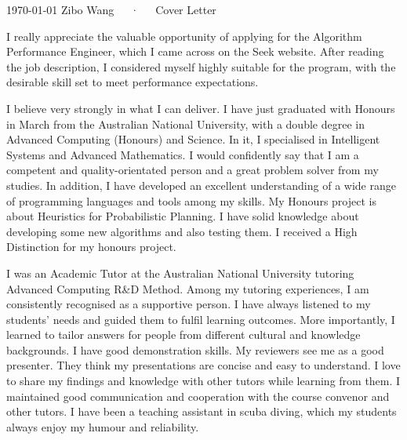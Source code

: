 \documentclass[11pt, a4paper]{awesome-cv}
\begin{document}
\makecvheader[R]

\makecvfooter
  {\today}
  {Zibo Wang~~~·~~~Cover Letter}
  {}

\makelettertitle

\begin{cvletter}

I really appreciate the valuable opportunity of applying for the Algorithm Performance Engineer, which I came across on the Seek website. After reading the job description, I considered myself highly suitable for the program, with the desirable skill set to meet performance expectations.


I believe very strongly in what I can deliver. I have just graduated with Honours in March from the Australian National University, with a double degree in Advanced Computing (Honours) and Science. In it, I specialised in Intelligent Systems and Advanced Mathematics. I would confidently say that I am a competent and quality-orientated person and a great problem solver from my studies. In addition, I have developed an excellent understanding of a wide range of programming languages and tools among my skills. My Honours project is about Heuristics for Probabilistic Planning. I have solid knowledge about developing some new algorithms and also testing them. I received a High Distinction for my honours project.


I was an Academic Tutor at the Australian National University tutoring Advanced Computing R\&D Method. Among my tutoring experiences, I am consistently recognised as a supportive person. I have always listened to my students' needs and guided them to fulfil learning outcomes. More importantly, I learned to tailor answers for people from different cultural and knowledge backgrounds. I have good demonstration skills. My reviewers see me as a good presenter. They think my presentations are concise and easy to understand. I love to share my findings and knowledge with other tutors while learning from them. I maintained good communication and cooperation with the course convenor and other tutors. I have been a teaching assistant in scuba diving, which my students always enjoy my humour and reliability.


\end{cvletter}
\end{document}
